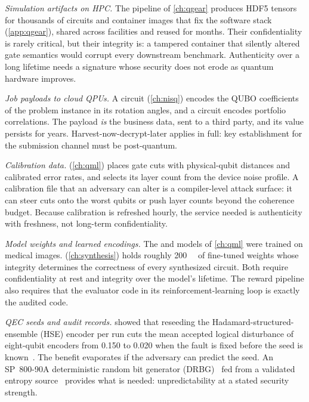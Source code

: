 \emph{Simulation artifacts on HPC.} The \qgear{} pipeline of \cref{ch:qgear} produces HDF5 tensors for thousands of circuits and container images that fix the software stack (\cref{app:qgear}), shared across facilities and reused for months. Their confidentiality is rarely critical, but their integrity is: a tampered container that silently altered gate semantics would corrupt every downstream benchmark. Authenticity over a long lifetime needs a signature whose security does not erode as quantum hardware improves.

\emph{Job payloads to cloud QPUs.} A \deal{} circuit (\cref{ch:nisq}) encodes the QUBO coefficients of the problem instance in its rotation angles, and a \qawa{} circuit encodes portfolio correlations. The payload \emph{is} the business data, sent to a third party, and its value persists for years. Harvest-now-decrypt-later applies in full: key establishment for the submission channel must be post-quantum.

\emph{Calibration data.} \shardq{} (\cref{ch:qml}) places gate cuts with physical-qubit distances and calibrated error rates, and \deal{} selects its layer count from the device noise profile. A calibration file that an adversary can alter is a compiler-level attack surface: it can steer cuts onto the worst qubits or push layer counts beyond the coherence budget. Because calibration is refreshed hourly, the service needed is authenticity with freshness, not long-term confidentiality.

\emph{Model weights and learned encodings.} The \qpie{} and \vqt{} models of \cref{ch:qml} were trained on medical images. \rubriq{} (\cref{ch:synthesis}) holds roughly \SI{200}{\giga\byte} of fine-tuned weights whose integrity determines the correctness of every synthesized circuit. Both require confidentiality at rest and integrity over the model's lifetime. The \rubriq{} reward pipeline also requires that the evaluator code in its reinforcement-learning loop is exactly the audited code.

\emph{QEC seeds and audit records.}  showed that reseeding the Hadamard-structured-ensemble (HSE) encoder per run cuts the mean accepted logical disturbance of eight-qubit encoders from 0.150 to 0.020 when the fault is fixed before the seed is known~\cite{guo2026qecaudit}. The benefit evaporates if the adversary can predict the seed. An SP~800-90A deterministic random bit generator (DRBG)~\cite{nist2015sp80090a} fed from a validated entropy source~\cite{nist2018sp80090b} provides what is needed: unpredictability at a stated security strength.

